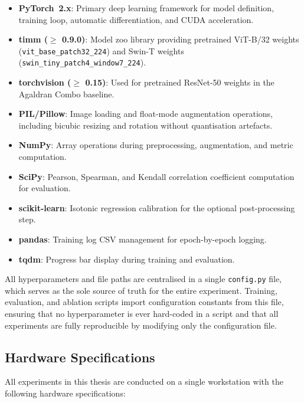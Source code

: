 \begin{itemize}
    \item \textbf{PyTorch~2.x}: Primary deep learning framework for model definition,
          training loop, automatic differentiation, and CUDA acceleration.
    \item \textbf{timm ($\geq$ 0.9.0)}: Model zoo library providing pretrained ViT-B/32
          weights (\texttt{vit\_base\_patch32\_224}) and Swin-T weights
          (\texttt{swin\_tiny\_patch4\_window7\_224}).
    \item \textbf{torchvision ($\geq$ 0.15)}: Used for pretrained ResNet-50 weights
          in the Agaldran Combo baseline.
    \item \textbf{PIL/Pillow}: Image loading and float-mode augmentation operations,
          including bicubic resizing and rotation without quantisation artefacts.
    \item \textbf{NumPy}: Array operations during preprocessing, augmentation, and
          metric computation.
    \item \textbf{SciPy}: Pearson, Spearman, and Kendall correlation coefficient
          computation for evaluation.
    \item \textbf{scikit-learn}: Isotonic regression calibration for the optional
          post-processing step.
    \item \textbf{pandas}: Training log CSV management for epoch-by-epoch logging.
    \item \textbf{tqdm}: Progress bar display during training and evaluation.
\end{itemize}

All hyperparameters and file paths are centralised in a single \texttt{config.py}
file, which serves as the sole source of truth for the entire experiment. Training,
evaluation, and ablation scripts import configuration constants from this file, ensuring
that no hyperparameter is ever hard-coded in a script and that all experiments are fully
reproducible by modifying only the configuration file.

\subsection{Hardware Specifications}

All experiments in this thesis are conducted on a single workstation with the following
hardware specifications:

